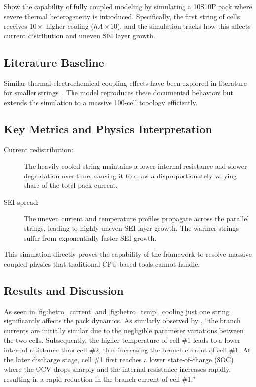 Show the capability of fully coupled modeling by simulating a 10S10P pack where severe thermal heterogeneity is introduced. Specifically, the first string of cells receives $10\times$ higher cooling ($hA \times 10$), and the simulation tracks how this affects current distribution and uneven SEI layer growth.

\subsection{Literature Baseline}

Similar thermal-electrochemical coupling effects have been explored in literature for smaller strings~\cite{Baumhofer2014}. The \VIBE{} model reproduces these documented behaviors but extends the simulation to a massive 100-cell topology efficiently.

\subsection{Key Metrics and Physics Interpretation}

\begin{description}
  \item[Current redistribution:] The heavily cooled string maintains a lower internal resistance and slower degradation over time, causing it to draw a disproportionately varying share of the total pack current.
  \item[SEI spread:] The uneven current and temperature profiles propagate across the parallel strings, leading to highly uneven SEI layer growth. The warmer strings suffer from exponentially faster SEI growth.
\end{description}
This simulation directly proves the capability of the framework to resolve massive coupled physics that traditional CPU-based tools cannot handle.

\subsection{Results and Discussion}

As seen in \cref{fig:hetro_current} and \cref{fig:hetro_temp}, cooling just one string significantly affects the pack dynamics. As similarly observed by \cite{Li2021}, ``the branch currents are initially similar due to the negligible parameter variations between the two cells. Subsequently, the higher temperature of cell \#1 leads to a lower internal resistance than cell \#2, thus increasing the branch current of cell \#1. At the later discharge stage, cell \#1 first reaches a lower state-of-charge (SOC) where the OCV drops sharply and the internal resistance increases rapidly, resulting in a rapid reduction in the branch current of cell \#1.''

